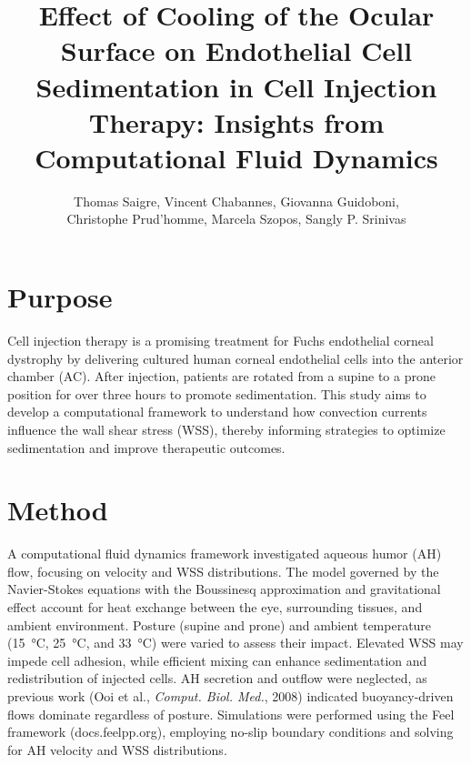 \documentclass[a4paper]{article}
\title{Effect of Cooling of the Ocular Surface on Endothelial Cell Sedimentation in Cell Injection Therapy: Insights from Computational Fluid Dynamics}
\author{
    Thomas Saigre\footnotemark[1],
    Vincent Chabannes\footnotemark[1],
    Giovanna Guidoboni\footnotemark[2],\\
    Christophe Prud'homme\footnotemark[1],
    Marcela Szopos\footnotemark[3],
    Sangly P. Srinivas\footnotemark[4]
}
\newcommand{\fpp}{Feel\nolinebreak\hspace{-.05em}\raisebox{.4ex}{\tiny\bf +}\nolinebreak\hspace{-.10em}\raisebox{.4ex}{\tiny\bf +}}
\begin{document}
\renewcommand{\thefootnote}{\fnsymbol{footnote}} %


\maketitle




\section*{Purpose}

Cell injection therapy is a promising treatment for Fuchs endothelial corneal dystrophy by delivering cultured human corneal endothelial cells into the anterior chamber (AC).
After injection, patients are rotated from a supine to a prone position for over three hours to promote sedimentation.
This study aims to develop a computational framework to understand how convection currents influence the wall shear stress (WSS), thereby informing strategies to optimize sedimentation and improve therapeutic outcomes.


\section*{Method}

A computational fluid dynamics framework investigated aqueous humor (AH) flow, focusing on velocity and WSS distributions.
The model governed by the Navier-Stokes equations with the Boussinesq approximation and gravitational effect account for heat exchange between the eye, surrounding tissues, and ambient environment.
Posture (supine and prone) and ambient temperature (\qty{15}{\degreeCelsius}, \qty{25}{\degreeCelsius}, and \qty{33}{\degreeCelsius}) were varied to assess their impact.
Elevated WSS may impede cell adhesion, while efficient mixing can enhance sedimentation and redistribution of injected cells.
AH secretion and outflow were neglected, as previous work (Ooi et al., \emph{Comput. Biol. Med.}, 2008) indicated buoyancy-driven flows dominate regardless of posture.
Simulations were performed using the \fpp{} framework (docs.feelpp.org), employing no-slip boundary conditions and solving for AH velocity and WSS distributions.
\end{document}
